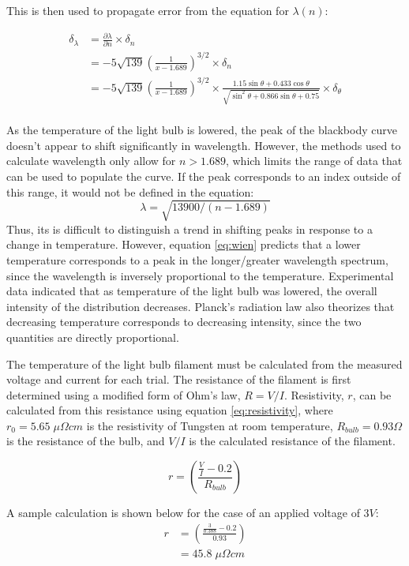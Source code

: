 \documentclass[a4paper]{article}
\begin{document}
This is then used to propagate error from the equation for $\lambda (n)$:

\begin{align*}
\delta_{\lambda} 
&= \frac{\partial \lambda}{\partial n} \times \delta_n \\
&= -5 \sqrt{139} 
    \left( \frac{1}{x-1.689} \right) ^{3/2} 
    \times \delta_n \\
&= -5 \sqrt{139} 
    \left( \frac{1}{x-1.689} \right) ^{3/2} 
    \times \frac{1.15 \sin \theta + 0.433 \cos \theta}{\sqrt{\sin^2 \theta + 0.866 \sin \theta + 0.75}} 
   \times \delta_{\theta} \\
\end{align*}

\qq As the temperature of the light bulb is lowered, the peak of the blackbody curve doesn't appear to shift significantly in wavelength. However, the methods used to calculate wavelength only allow for $n > 1.689$, which limits the range of data that can be used to populate the curve. If the peak corresponds to an index outside of this range, it would not be defined in the equation: $$\lambda = \sqrt{13900/(n-1.689)}$$ Thus, its is difficult to distinguish a trend in shifting peaks in response to a change in temperature. However, equation \ref{eq:wien} predicts that a lower temperature corresponds to a peak in the longer/greater wavelength spectrum, since the wavelength is inversely proportional to the temperature. Experimental data indicated that as temperature of the light bulb was lowered, the overall intensity of the distribution decreases. Planck's radiation law also theorizes that decreasing temperature corresponds to decreasing intensity, since the two quantities are directly proportional.

\qq The temperature of the light bulb filament must be calculated from the measured voltage and current for each trial. The resistance of the filament is first determined using a modified form of Ohm's law, $R=V/I$. Resistivity, $r$, can be calculated from this resistance using equation \ref{eq:resistivity}, where $r_0 = 5.65 \; \mu \Omega cm$ is the resistivity of Tungsten at room temperature, $R_{bulb}=0.93 \Omega$ is the resistance of the bulb, and $V/I$ is the calculated resistance of the filament. 

\begin{equation}
\label{eq:resistivity}
r =
\left(
\frac{\frac{V}{I}-0.2}{R_{bulb}}
\right)
\end{equation}

A sample calculation is shown below for the case of an applied voltage of $3V$:
\begin{align*}
r &=
\left(
\frac{\frac{3}{0.388}-0.2}{0.93}
\right) \\
&= 45.8 \; \mu \Omega cm
\end{align*}
\end{document}

